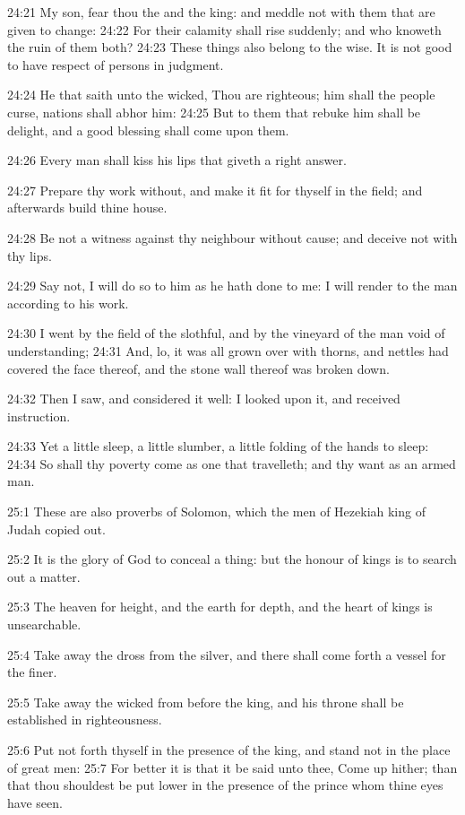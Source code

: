 24:21 My son, fear thou the \LORD and the king: and meddle not with
them that are given to change: 24:22 For their calamity shall rise
suddenly; and who knoweth the ruin of them both?  24:23 These things
also belong to the wise. It is not good to have respect of persons in
judgment.

24:24 He that saith unto the wicked, Thou are righteous; him shall the
people curse, nations shall abhor him: 24:25 But to them that rebuke
him shall be delight, and a good blessing shall come upon them.

24:26 Every man shall kiss his lips that giveth a right answer.

24:27 Prepare thy work without, and make it fit for thyself in the
field; and afterwards build thine house.

24:28 Be not a witness against thy neighbour without cause; and
deceive not with thy lips.

24:29 Say not, I will do so to him as he hath done to me: I will
render to the man according to his work.

24:30 I went by the field of the slothful, and by the vineyard of the
man void of understanding; 24:31 And, lo, it was all grown over with
thorns, and nettles had covered the face thereof, and the stone wall
thereof was broken down.

24:32 Then I saw, and considered it well: I looked upon it, and
received instruction.

24:33 Yet a little sleep, a little slumber, a little folding of the
hands to sleep: 24:34 So shall thy poverty come as one that
travelleth; and thy want as an armed man.

25:1 These are also proverbs of Solomon, which the men of Hezekiah
king of Judah copied out.

25:2 It is the glory of God to conceal a thing: but the honour of
kings is to search out a matter.

25:3 The heaven for height, and the earth for depth, and the heart of
kings is unsearchable.

25:4 Take away the dross from the silver, and there shall come forth a
vessel for the finer.

25:5 Take away the wicked from before the king, and his throne shall
be established in righteousness.

25:6 Put not forth thyself in the presence of the king, and stand not
in the place of great men: 25:7 For better it is that it be said unto
thee, Come up hither; than that thou shouldest be put lower in the
presence of the prince whom thine eyes have seen.

